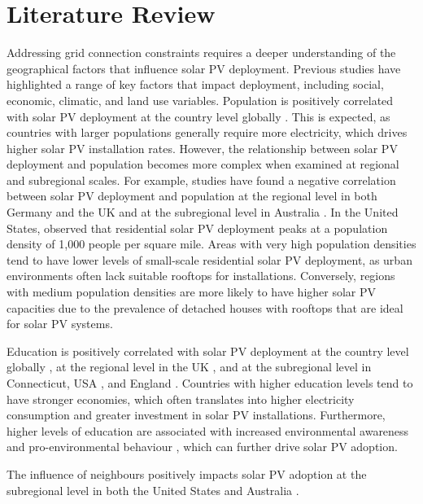 \section{Literature Review}
Addressing grid connection constraints requires a deeper understanding of the geographical factors that influence solar PV deployment. Previous studies have highlighted a range of key factors that impact deployment, including social, economic, climatic, and land use variables. Population is positively correlated with solar PV deployment at the country level globally \cite{alghanem_global_2024}. This is expected, as countries with larger populations generally require more electricity, which drives higher solar PV installation rates. However, the relationship between solar PV deployment and population becomes more complex when examined at regional and subregional scales. For example, studies have found a negative correlation between solar PV deployment and population at the regional level in both Germany \cite{mayer_deepsolar_2020} and the UK \cite{balta-ozkan_regional_2015} and at the subregional level in Australia \cite{fuentes_solar_2024}. In the United States, \citet{yu_deepsolar_2018} observed that residential solar PV deployment peaks at a population density of 1,000 people per square mile. Areas with very high population densities tend to have lower levels of small-scale residential solar PV deployment, as urban environments often lack suitable rooftops for installations. Conversely, regions with medium population densities are more likely to have higher solar PV capacities due to the prevalence of detached houses with rooftops that are ideal for solar PV systems. 

Education is positively correlated with solar PV deployment at the country level globally \cite{alghanem_global_2024}, at the regional level in the UK \cite{balta-ozkan_regional_2015}, and at the subregional level in Connecticut, USA \cite{yu_deepsolar_2018}, and England \cite{laura_williams_identifying_2012}. Countries with higher education levels tend to have stronger economies, which often translates into higher electricity consumption and greater investment in solar PV installations. Furthermore, higher levels of education are associated with increased environmental awareness and pro-environmental behaviour \cite{meyer_does_2015,wang_green_2022,ozbay_exploring_2022}, which can further drive solar PV adoption.

The influence of neighbours positively impacts solar PV adoption at the subregional level in both the United States and Australia \cite{graziano_spatial_2015,fuentes_solar_2024}.


